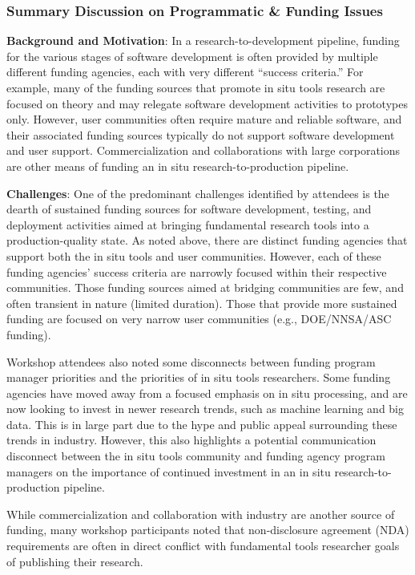\subsubsection{Summary Discussion on Programmatic \& Funding Issues}
\label{sec:funding}
\begin{refsection}

\textbf{Background and Motivation}: In a research-to-development pipeline, funding for the various stages of software development is often provided by multiple different funding agencies, each with very different ``success criteria.''  For example, many of the funding sources that promote in situ tools research are focused on theory and may relegate software development activities to prototypes only. However, user communities often require mature and reliable software, and their associated funding sources typically do not support software development and user support.  Commercialization and collaborations with large corporations are other means of funding an in situ research-to-production pipeline.

\textbf{Challenges}: One of the predominant challenges identified by attendees is the dearth of sustained funding sources for software development, testing, and deployment activities aimed at bringing fundamental research tools into a production-quality state.  As noted above, there are distinct funding agencies that support both the in situ tools and user communities.  However, each of these funding agencies’ success criteria are narrowly focused within their respective communities.  Those funding sources aimed at bridging communities are few, and often transient in nature (limited duration).  Those that provide more sustained funding are focused on very narrow user communities (e.g., DOE/NNSA/ASC funding).  

Workshop attendees also noted some disconnects between funding program manager priorities and  the priorities of in situ tools researchers.  Some funding agencies have moved away from a focused emphasis on in situ processing, and are now looking to invest in newer research trends, such as machine learning and big data.  This is in large part due to the hype and public appeal surrounding these trends in industry.  However, this also highlights a potential communication disconnect between the in situ tools community and funding agency program managers on the importance of continued investment in an in situ research-to-production pipeline.

While commercialization and collaboration with industry are another source of funding, many workshop participants noted that non-disclosure agreement (NDA) requirements are often in direct conflict with fundamental tools researcher goals of publishing their research. 


\end{refsection}

